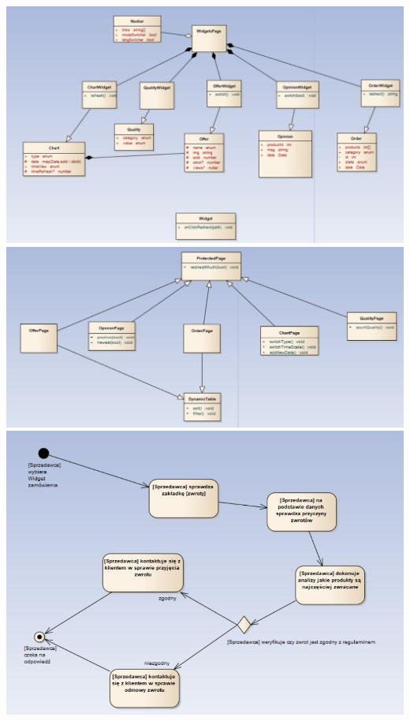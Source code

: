 \documentclass[a4paper,11pt]{article}
\begin{document}
\includegraphics[scale=0.5]{src2/src2/c4.png}\\
\includegraphics[scale=0.5]{src2/src2/c5.png}\\
\includegraphics[scale=0.5]{src2/src2/c6.png}\\
\end{document}

